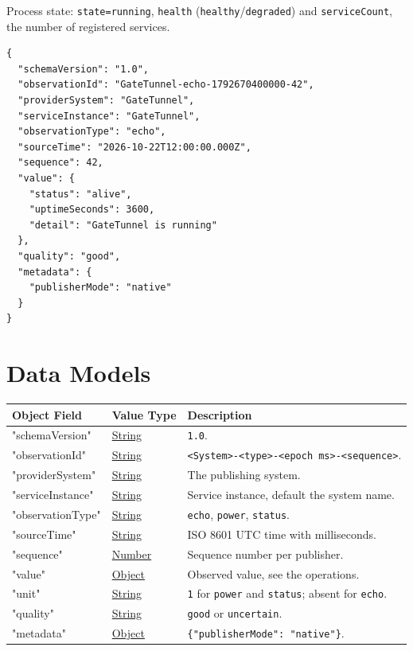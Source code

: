 \documentclass[a4paper]{arrowhead}
\newcommand{\oref}[1]{{\textcolor{ArrowheadBlue}{\hyperref[sec:operations:#1]{#1}}}}
\newcommand{\pref}[1]{{\textcolor{ArrowheadGrey}{\hyperref[sec:model:primitives:#1]{#1}}}}
\begin{document}
Process state: \texttt{state=\allowbreak{}running}, \texttt{health} (\texttt{healthy}/\texttt{degraded}) and \texttt{serviceCount}, the number of registered services.

\begin{lstlisting}[caption={An \oref{echo} observation.}]
{
  "schemaVersion": "1.0",
  "observationId": "GateTunnel-echo-1792670400000-42",
  "providerSystem": "GateTunnel",
  "serviceInstance": "GateTunnel",
  "observationType": "echo",
  "sourceTime": "2026-10-22T12:00:00.000Z",
  "sequence": 42,
  "value": {
    "status": "alive",
    "uptimeSeconds": 3600,
    "detail": "GateTunnel is running"
  },
  "quality": "good",
  "metadata": {
    "publisherMode": "native"
  }
}
\end{lstlisting}

\newpage

\section{Data Models}
\label{sec:model}


\noindent\begin{tabularx}{\textwidth}{| p{4.25cm} | p{3.5cm} | X |} \hline
\rowcolor{gray!33} Object Field & Value Type & Description \\ \hline
"schemaVersion" & \pref{String} & \texttt{1.0}. \\ \hline
"observationId" & \pref{String} & \texttt{<System>-<type>-<epoch ms>-<sequence>}. \\ \hline
"providerSystem" & \pref{String} & The publishing system. \\ \hline
"serviceInstance" & \pref{String} & Service instance, default the system name. \\ \hline
"observationType" & \pref{String} & \texttt{echo}, \texttt{power}, \texttt{status}. \\ \hline
"sourceTime" & \pref{String} & ISO 8601 UTC time with milliseconds. \\ \hline
"sequence" & \pref{Number} & Sequence number per publisher. \\ \hline
"value" & \pref{Object} & Observed value, see the operations. \\ \hline
"unit" & \pref{String} & \texttt{1} for \texttt{power} and \texttt{status}; absent for \texttt{echo}. \\ \hline
"quality" & \pref{String} & \texttt{good} or \texttt{uncertain}. \\ \hline
"metadata" & \pref{Object} & \texttt{\{"publisherMode": "native"\}}. \\ \hline
\end{tabularx}
\end{document}
